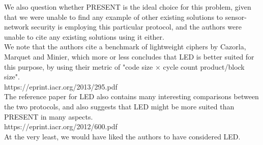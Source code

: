 We also question whether PRESENT is the ideal choice for this problem, given that we were unable to find any example of other existing solutions to sensor-network security is employing this particular protocol, and the authors were unable to cite any existing solutions using it either.\\
We note that the authors cite a benchmark of lightweight ciphers by Cazorla, Marquet and Minier, which more or less concludes that LED is better suited for this purpose, by using their metric of "code size × cycle count product/block size".\\
https://eprint.iacr.org/2013/295.pdf \\
The reference paper for LED also contains many interesting comparisons between the two protocols, and also suggests that LED might be more suited than PRESENT in many aspects.\\
https://eprint.iacr.org/2012/600.pdf \\

At the very least, we would have liked the authors to have considered LED.\\
